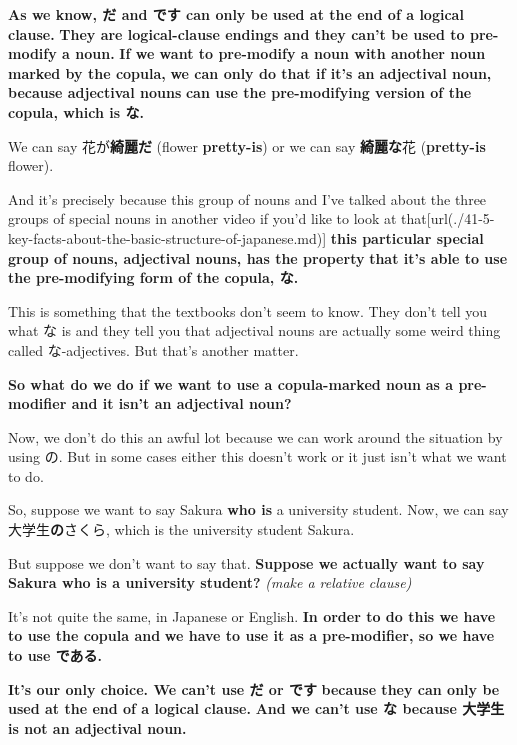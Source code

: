 \thinrule

{\bf As we know, だ and です can only be used at the end of a logical clause.} {\bf They are logical-clause endings and they can't be used to pre-modify a noun.} {\bf If we want to pre-modify a noun with another noun marked by the copula,} {\bf we can only do that if it's an adjectival noun, because adjectival nouns} {\bf can use the pre-modifying version of the copula, which is な.}

\thinrule

We can say 花が{\bf 綺麗だ} (flower {\bf pretty-is}) or we can say {\bf 綺麗な}花 ({\bf pretty-is} flower).

{}

And it's precisely because this group of nouns and I've talked about the three groups of special nouns in another video if you'd like to look at that\goto{{[}41{]}}[url(./41-5-key-facts-about-the-basic-structure-of-japanese.md)] {\bf this particular special group of nouns, adjectival nouns, has the property} {\bf that it's able to use the pre-modifying form of the copula, な.}

This is something that the textbooks don't seem to know. They don't tell you what な is and they tell you that adjectival nouns are actually some weird thing called な-adjectives. But that's another matter.

{\bf So what do we do if we want to use a copula-marked noun} {\bf as a pre-modifier and it isn't an adjectival noun?}

Now, we don't do this an awful lot because we can work around the situation by using の. But in some cases either this doesn't work or it just isn't what we want to do.

So, suppose we want to say Sakura {\bf who is} a university student. Now, we can say 大学生{\bf の}さくら, which is the university student Sakura.

But suppose we don't want to say that. {\bf Suppose we actually want to say Sakura who is a university student?} {\em (make a relative clause)}

{}

It's not quite the same, in Japanese or English. {\bf In order to do this we have to use the copula and} {\bf we have to use it as a pre-modifier, so we have to use である.}

{\bf It's our only choice. We can't use だ or です} {\bf because they can only be used at the end of a logical clause.} {\bf And we can't use な because 大学生 is not an adjectival noun.}

